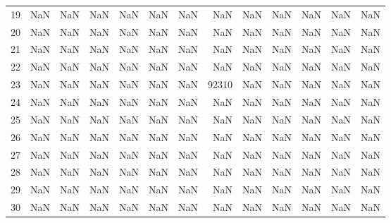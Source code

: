 \begin{table}
\begin{tabular}{lrrrrrrrrrrrr}
19 & NaN & NaN & NaN & NaN & NaN & NaN & NaN & NaN & NaN & NaN & NaN & NaN \\
20 & NaN & NaN & NaN & NaN & NaN & NaN & NaN & NaN & NaN & NaN & NaN & NaN \\
21 & NaN & NaN & NaN & NaN & NaN & NaN & NaN & NaN & NaN & NaN & NaN & NaN \\
22 & NaN & NaN & NaN & NaN & NaN & NaN & NaN & NaN & NaN & NaN & NaN & NaN \\
23 & NaN & NaN & NaN & NaN & NaN & NaN & 92310 & NaN & NaN & NaN & NaN & NaN \\
24 & NaN & NaN & NaN & NaN & NaN & NaN & NaN & NaN & NaN & NaN & NaN & NaN \\
25 & NaN & NaN & NaN & NaN & NaN & NaN & NaN & NaN & NaN & NaN & NaN & NaN \\
26 & NaN & NaN & NaN & NaN & NaN & NaN & NaN & NaN & NaN & NaN & NaN & NaN \\
27 & NaN & NaN & NaN & NaN & NaN & NaN & NaN & NaN & NaN & NaN & NaN & NaN \\
28 & NaN & NaN & NaN & NaN & NaN & NaN & NaN & NaN & NaN & NaN & NaN & NaN \\
29 & NaN & NaN & NaN & NaN & NaN & NaN & NaN & NaN & NaN & NaN & NaN & NaN \\
30 & NaN & NaN & NaN & NaN & NaN & NaN & NaN & NaN & NaN & NaN & NaN & NaN \\
\bottomrule
\end{tabular}
\end{table}
